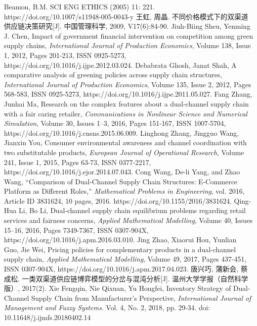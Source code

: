 \documentclass{article}
\begin{document}
\begin{thebibliography}{1}
 Beamon, B.M. SCI ENG ETHICS (2005) 11: 221. https://doi.org/10.1007/s11948-005-0043-y
 王虹, 周晶. 不同价格模式下的双渠道供应链决策研究[J]. 中国管理科学, 2009, V17(6):84-90.
 Jiuh-Biing Sheu, Yenming J. Chen, Impact of government financial intervention on competition among green supply chains, \emph{International Journal of Production Economics}, Volume 138, Issue 1, 2012, Pages 201-213, ISSN 0925-5273, https://doi.org/10.1016/j.ijpe.2012.03.024.
 Debabrata Ghosh, Janat Shah, A comparative analysis of greening policies across supply chain structures, \emph{International Journal of Production Economics}, Volume 135, Issue 2, 2012, Pages 568-583, ISSN 0925-5273, https://doi.org/10.1016/j.ijpe.2011.05.027.
 Fang Zhang, Junhai Ma, Research on the complex features about a dual-channel supply chain with a fair caring retailer, \emph{Communications in Nonlinear Science and Numerical Simulation}, Volume 30, Issues 1–3, 2016, Pages 151-167, ISSN 1007-5704, https://doi.org/10.1016/j.cnsns.2015.06.009.
 Linghong Zhang, Jingguo Wang, Jianxin You, Consumer environmental awareness and channel coordination with two substitutable products, \emph{European Journal of Operational Research}, Volume 241, Issue 1, 2015, Pages 63-73, ISSN 0377-2217, https://doi.org/10.1016/j.ejor.2014.07.043.
 Cong Wang, De-li Yang, and Zhao Wang, “Comparison of Dual-Channel Supply Chain Structures: E-Commerce Platform as Different Roles,” \emph{Mathematical Problems in Engineering}, vol. 2016, Article ID 3831624, 10 pages, 2016. https://doi.org/10.1155/2016/3831624.
 Qing-Hua Li, Bo Li, Dual-channel supply chain equilibrium problems regarding retail services and fairness concerns, \emph{Applied Mathematical Modelling}, Volume 40, Issues 15–16, 2016, Pages 7349-7367, ISSN 0307-904X, https://doi.org/10.1016/j.apm.2016.03.010.
 Jing Zhao, Xiaorui Hou, Yunlian Guo, Jie Wei, Pricing policies for complementary products in a dual-channel supply chain, \emph{Applied Mathematical Modelling}, Volume 49, 2017, Pages 437-451, ISSN 0307-904X, https://doi.org/10.1016/j.apm.2017.04.023.
 唐兴巧, 蒲新会, 蔡成松. 一类双渠道供应链博弈模型的分岔与混沌分析[J]. 温州大学学报（自然科学版）, 2017(2).
 Xie Fengqin, Nie Qixuan, Yu Hongfei, Inventory Strategy of Dual-Channel Supply Chain from Manufacturer's Perspective, \emph{International Journal of Management and Fuzzy Systems}. Vol. 4, No. 2, 2018, pp. 29-34. doi: 10.11648/j.ijmfs.20180402.14

\end{thebibliography}
\end{document}
